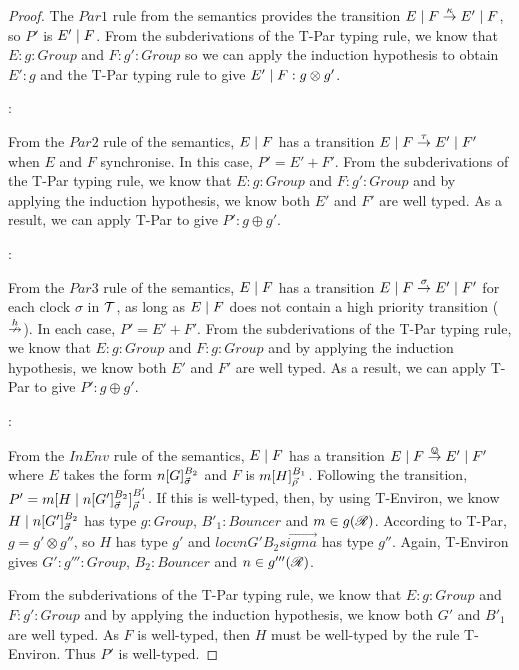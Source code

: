 \begin{proof}
\noindent The $Par1$ rule from the semantics provides the transition
$E \;|\; F \stackrel{\kappa}{\rightarrow} E' \;|\; F$, so $P'$ is $E' \;|\; F$.  From the
subderivations of the T-Par typing rule, we know that $E : g : Group$
and $F : g' : Group$ so we can apply the induction hypothesis to obtain
$E' : g$ and the T-Par typing rule to give $E' \;|\; F : g \otimes g'$.

:

\noindent From the $Par2$ rule of the semantics, $E \;|\; F$ has a
transition $E \;|\; F \stackrel{\tau}{\rightarrow} E' \;|\; F'$ when $E$ and $F$
synchronise.  In this case, $P' = E' + F'$.  From the subderivations
of the T-Par typing rule, we know that $E : g : Group$ and $F : g' :
Group$ and by applying the induction hypothesis, we know both $E'$ and
$F'$ are well typed.  As a result, we can apply T-Par to give $P' : g
\oplus g'$.

:

\noindent From the $Par3$ rule of the semantics, $E \;|\; F$ has a
transition $E \;|\; F \stackrel{\sigma}{\rightarrow} E' \;|\; F'$ for each clock
$\sigma$ in $\text{$\mathcal{T}$}$, as long as $E \;|\; F$ does not contain a high
priority transition ($\stackrel{h}{\nrightarrow}$).  In each case, $P' = E' + F'$.
From the subderivations of the T-Par typing rule, we know that $E : g
: Group$ and $F : g : Group$ and by applying the induction hypothesis,
we know both $E'$ and $F'$ are well typed.  As a result, we can apply
T-Par to give $P' : g \oplus g'$.

:

\noindent From the $InEnv$ rule of the semantics, $E \;|\; F$ has a
transition $E \;|\; F \stackrel{\varovee}{\rightarrow} E' \;|\; F'$ where $E$ takes the form
${n}[ G ]^{B_2}_{\vec{\sigma}}$ and $F$ is
${m}[ H ]^{B_1}_{\vec{\rho}}$.  Following the transition, $P' =
{m}[ H \;|\; {n}[ G' ]^{B_2}_{\vec{\sigma}} ]^{B'_1}_{\vec{\rho}}$.
If this is well-typed, then, by using T-Environ, we know $H \;|\;
{n}[ G' ]^{B_2}_{\vec{\sigma}}$ has type $g : Group$, $B'_1 :
Bouncer$ and $m \in g(\mathscr{R})$.  According to T-Par, $g = g'
\otimes g''$, so $H$ has type $g'$ and $locv{n}{G'}{B_2}{\vec{sigma}}$
has type $g''$.  Again, T-Environ gives $G' : g''' : Group$, $B_2 :
Bouncer$ and $n \in g'''(\mathscr{R})$.

From the subderivations of the T-Par typing rule, we know that $E :
g : Group$ and $F : g' : Group$ and by applying the induction
hypothesis, we know both $G'$ and $B'_1$ are well typed.  As $F$ is
well-typed, then $H$ must be well-typed by the rule T-Environ.  Thus
$P'$ is well-typed.


\end{proof}
